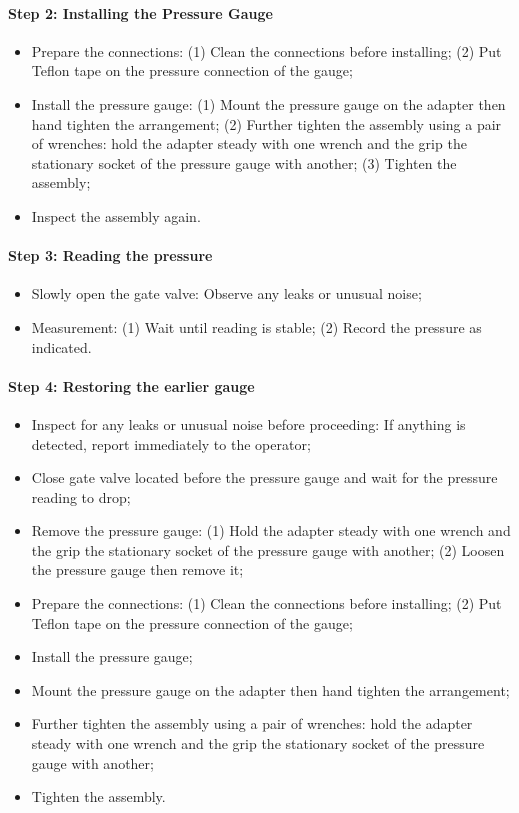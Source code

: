 \paragraph{Step 2: Installing the Pressure Gauge}
\begin{itemize}
\item Prepare the connections: (1) Clean the connections before installing; (2) Put Teflon tape on the pressure connection of the gauge;
\item Install the pressure gauge: (1) Mount the pressure gauge on the adapter then hand tighten the arrangement; (2) Further tighten the assembly using a pair of wrenches: hold the adapter steady with one wrench and the grip the stationary socket of the pressure gauge with another; (3) Tighten the assembly;
\item Inspect the assembly again.
\end{itemize}
\paragraph{Step 3: Reading the pressure}
\begin{itemize}
\item Slowly open the gate valve: Observe any leaks or unusual noise;
\item Measurement: (1) Wait until reading is stable; (2) Record the pressure as indicated.
\end{itemize}

\paragraph{Step 4: Restoring the earlier gauge}
\begin{itemize}
\item Inspect for any leaks or unusual noise before proceeding: If anything is detected, report immediately to the operator;
\item 	Close gate valve located before the pressure gauge and wait for the pressure reading to drop;
\item Remove the pressure gauge: (1) Hold the adapter steady with one wrench and the grip the stationary socket of the pressure gauge with another; (2) Loosen the pressure gauge then remove it;
\item 	Prepare the connections: (1) Clean the connections before installing; (2) Put Teflon tape on the pressure connection of the gauge;
\item 	Install the pressure gauge;
\item 	Mount the pressure gauge on the adapter then hand tighten the arrangement;
\item 	Further tighten the assembly using a pair of wrenches: hold the adapter steady with one wrench and the grip the stationary socket of the pressure gauge with another;
\item 	Tighten the assembly.
\end{itemize}

